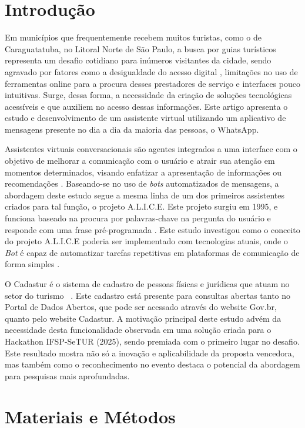 \documentclass[a4paper,11pt]{article} %
\begin{document}
\section*{Introdução}


Em municípios que frequentemente recebem muitos turistas, como o de Caraguatatuba, no Litoral Norte de São Paulo, a busca por guias turísticos representa um desafio cotidiano para inúmeros visitantes da cidade, sendo agravado por fatores como a desigualdade do acesso digital \cite{ref11}, limitações no uso de ferramentas online para a procura desses prestadores de serviço e interfaces pouco intuitivas. Surge, dessa forma, a necessidade da criação de soluções tecnológicas acessíveis e que auxiliem no acesso dessas informações. Este artigo apresenta o estudo e desenvolvimento de um assistente virtual utilizando um aplicativo de mensagens presente no dia a dia da maioria das pessoas, o WhatsApp. 

Assistentes virtuais conversacionais são agentes integrados a uma interface com o objetivo de melhorar a comunicação com o usuário e atrair sua atenção em momentos determinados, visando enfatizar a apresentação de informações ou recomendações \cite{reategui2005assistente}. Baseando-se no uso de \textit{bots} automatizados de mensagens, a abordagem deste estudo segue a mesma linha de um dos primeiros assistentes criados para tal função, o projeto A.L.I.C.E. Este projeto surgiu em 1995, e funciona baseado na procura por palavras-chave na pergunta do usuário e responde com uma frase pré-programada \cite{alice}. Este estudo investigou como o conceito do projeto A.L.I.C.E poderia ser implementado com tecnologias atuais, onde o \textit{Bot} é capaz de automatizar tarefas repetitivas em plataformas de comunicação de forma simples \cite{weni}.

O Cadastur é o sistema de cadastro de pessoas físicas e jurídicas que atuam no setor do turismo ~\cite{cadastur2025}. Este cadastro está presente para consultas abertas tanto no Portal de Dados Abertos, que pode ser acessado através do website Gov.br, quanto pelo website Cadastur. A motivação principal deste estudo advém da necessidade desta funcionalidade observada em uma solução criada para o Hackathon IFSP-SeTUR (2025), sendo premiada com o primeiro lugar no desafio. Este resultado mostra não só a inovação e aplicabilidade da proposta vencedora, mas também como o reconhecimento no evento destaca o potencial da abordagem para pesquisas mais aprofundadas.

\section*{Materiais e Métodos}
\end{document}
